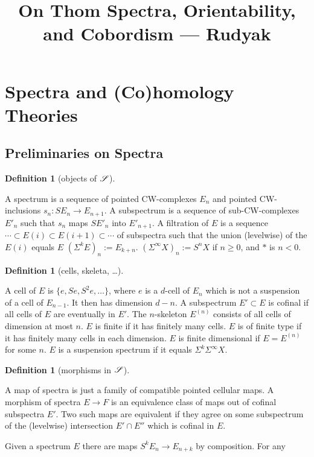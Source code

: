 \documentclass[11pt]{article}
\title{On Thom Spectra, Orientability, and Cobordism\small{ --- Rudyak}}
\author{}
\date{}
\theoremstyle{plain}
\theoremstyle{definition}
\newtheorem{defn}[thm]{Definition}
\begin{document}
\setcounter{section}{1}
\section{Spectra and (Co)homology Theories}
\subsection{Preliminaries on Spectra}
\begin{defn}[objects of $\mathscr{S}$]\hfil
\begin{itemise}
\itm[(a)]A spectrum is a sequence of pointed CW-complexes $E_n$ and pointed
CW-inclusions $s_n:SE_n\to E_{n+1}$.
\itm[(b)]A subspectrum is a sequence of sub-CW-complexes $E'_n$ such that $s_n$
maps $SE'_n$ into $E'_{n+1}$.
\itm[(c)]A filtration of $E$ is a sequence 
$\cdots\subset E(i)\subset E(i+1)\subset\cdots$ of subspectra such that the
union (levelwise) of the $E(i)$ equals $E$
\itm[(d)]$(\Sigma^kE)_n:=E_{k+n}$.
\itm[(e)]$(\Sigma^\infty X)_n:=S^nX$ if $n\geq0$, and $*$ is $n<0$.
\end{itemise}
\end{defn}
\begin{defn}[cells, skeleta, \ldots]\hfil
\begin{itemise}
\itm[(a)]
A cell of $E$ is $\{e,Se,S^2e,\ldots\}$, where $e$ is a $d$-cell of $E_n$ which
is not a suspension of a cell of $E_{n-1}$. It then has dimension $d-n$.
\itm[(b)]A subspectrum $E'\subset E$ is cofinal if all cells of $E$ are
eventually in $E'$.
\itm[(c)]The $n$-skeleton $E^{(n)}$ consists of all cells of dimension at most
$n$.
\itm[(d)]$E$ is finite if it has finitely many cells.
\itm[(e)]$E$ is of finite type if it has finitely many cells in each dimension.
\itm[(f)]$E$ is finite dimensional if $E=E^{(n)}$ for some $n$.
\itm[(g)]$E$ is a suspension spectrum if it equals $\Sigma^k\Sigma^\infty X$.
\end{itemise}
\end{defn}
\begin{defn}[morphisms in $\mathscr{S}$]\hfil
\begin{itemise}
\itm[(a)]A map of spectra is just a family of compatible pointed cellular maps.
\itm[(b)]A morphism of spectra $E\to F$ is an equivalence class of maps out of
cofinal subspectra $E'$. Two such maps are equivalent if they agree on some
subspectrum of the (levelwise) intersection $E'\cap E''$ which is cofinal in
$E$.
\end{itemise}
\end{defn}
Given a spectrum $E$ there are maps $S^kE_n\to E_{n+k}$ by composition. For any
\end{document}
